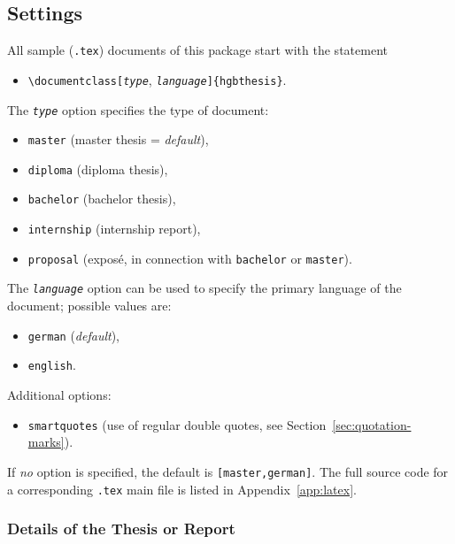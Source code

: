 \subsection{Settings}
\label{sec:hagenberg-settings}

All sample (\verb!.tex!) documents of this package start with the statement
%
\begin{itemize}
    \item[] \verb!\documentclass[!\texttt{\emph{type}},
    \texttt{\emph{language}}\verb!]{hgbthesis}!.
\end{itemize}
%
The \texttt{\emph{type}} option specifies the type of document:
%
\begin{itemize}
    \item[] \texttt{master} (master thesis = \emph{default}),
    \item[] \texttt{diploma} (diploma thesis),
    \item[] \texttt{bachelor} (bachelor thesis),
    \item[] \texttt{internship} (internship report),
	\item[] \texttt{proposal} (exposé, in connection with \texttt{bachelor} or
	\texttt{master}).
\end{itemize}
%
The \texttt{\emph{language}} option can be used to specify the primary language
of the document; possible values are:
%
\begin{itemize}
    \item[] \texttt{german} (\emph{default}),
    \item[] \texttt{english}.
\end{itemize}
%
Additional options:
%
\begin{itemize}
    \item[] \texttt{smartquotes} (use of regular double quotes, see
    Section~\ref{sec:quotation-marks}).
\end{itemize}
%
If \emph{no} option is specified, the default is \texttt{[master,german]}. The
full source code for a corresponding \verb!.tex! main file is listed in
Appendix~\ref{app:latex}.

\subsubsection{Details of the Thesis or Report}


